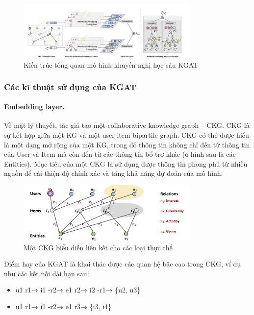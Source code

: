 \begin{figure}[h]
    \centering
    \includegraphics[width=0.8\textwidth]{figures/65.png}
    \caption{Kiến trúc tổng quan mô hình khuyến nghị học sâu KGAT}
    \label{fig:kgat_model}
\end{figure}

\subsubsection{Các kĩ thuật sử dụng của KGAT}
\paragraph{Embedding layer.}
Về mặt lý thuyết, tác giả tạo một collaborative knowledge graph – CKG. CKG là sự kết hợp giữa một KG và một user-item bipartile graph. CKG có thể được hiểu là một dạng mở rộng của một KG, trong đó thông tin không chỉ đến từ thông tin của User và Item mà còn đến từ các thông tin bổ trợ khác (ở hình sau là các Entities). Mục tiêu của một CKG là sử dụng được thông tin phong phú từ nhiều nguồn để cải thiện độ chính xác và tăng khả năng dự đoán của mô hình.

\begin{figure}[h]
    \centering
    \includegraphics[width=0.8\textwidth]{figures/66.png}
    \caption{Một CKG biểu diễn liên kết cho các loại thực thể}
    \label{fig:ckg_example}
\end{figure}

Điểm hay của KGAT là khai thác được các quan hệ bậc cao trong CKG, ví dụ như các kết nối dài hạn sau:
\begin{itemize}
    \item u1  r1→  i1  -r2→  e1  r2→  i2  -r1→  \{u2,  u3\}
    \item u1  r1→  i1  -r2→  e1  r3→ \{i3,  i4\}
\end{itemize}

